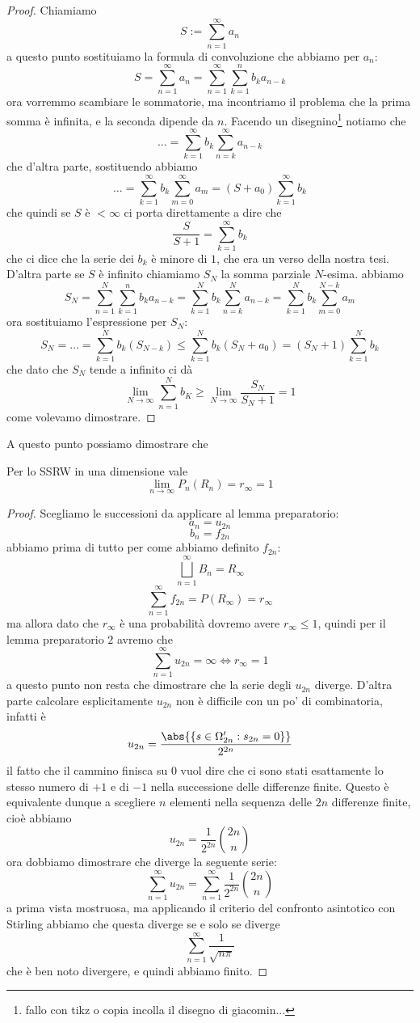 \documentclass[11pt]{scrartcl}
\begin{document}
	\begin{proof}
		Chiamiamo 
		$$S:=\sum_{n=1}^{\infty}a_n$$
		a questo punto sostituiamo la formula di convoluzione che abbiamo per $a_n$:
		$$S=\sum_{n=1}^{\infty}a_n=\sum_{n=1}^{\infty}\sum_{k=1}^{n}b_k a_{n-k}$$
		ora vorremmo scambiare le sommatorie, ma incontriamo il problema che la prima somma è infinita, e la seconda dipende da $n$. Facendo un disegnino\footnote{fallo con tikz o copia incolla il disegno di giacomin...} notiamo che 
		$$\dots=\sum_{k=1}^\infty b_k \sum_{n=k}^{\infty}a_{n-k}$$
		che d'altra parte, sostituendo abbiamo
		$$\dots =\sum_{k=1}^\infty b_k \sum_{m=0}^\infty a_m =(S+a_0)\sum_{k=1}^{\infty}b_k$$
		che quindi se $S$ è $<\infty$ ci porta direttamente a dire che 
		$$\frac{S}{S+1}=\sum_{k=1}^{\infty}b_k$$
		che ci dice che la serie dei $b_k$ è minore di $1$, che era un verso della nostra tesi. D'altra parte se $S$ è infinito chiamiamo $S_N$ la somma parziale $N$-esima. abbiamo
		$$S_N=\sum_{n=1}^{N}\sum_{k=1}^{n}b_k a_{n-k}=\sum_{k=1}^{N}b_k \sum_{n=k}^{N}a_{n-k}=\sum_{k=1}^{N}b_k \sum_{m=0}^{N-k}a_m$$
		ora sostituiamo l'espressione per $S_N$:
		$$S_N=\dots= \sum_{k=1}^{N}b_k (S_{N-k})\le \sum_{k=1}^{N}b_k (S_N+a_0)=(S_N+1)\sum_{k=1}^{N}b_k$$
		che dato che $S_N$ tende a infinito ci dà
		$$\lim_{N\to\infty}\sum_{n=1}^Nb_K\ge \lim_{N\to\infty}\frac{S_N}{S_N+1}=1$$
		come volevamo dimostrare.
	\end{proof}
	A questo punto possiamo dimostrare che
	\begin{theorem}
		Per lo SSRW in una dimensione vale
		$$\lim_{n\to\infty}P_n(R_n) = r_\infty=1$$
	\end{theorem}
	\begin{proof}
		Scegliamo le successioni da applicare al lemma preparatorio: 
		$$a_n=u_{2n}$$
		$$b_n=f_{2n}$$
		abbiamo prima di tutto per come abbiamo definito $f_{2n}$:
		$$\bigsqcup_{n=1}^\infty B_n=R_\infty$$
		$$\sum_{n=1}^{\infty}f_{2n}=P(R_\infty)=r_\infty$$
		ma allora dato che $r_\infty$ è una probabilità dovremo avere $r_\infty\le 1$, quindi per il lemma preparatorio $2$ avremo che
		$$\sum_{n=1}^{\infty}u_{2n}=\infty \iff r_\infty =1$$
		a questo punto non resta che dimostrare che la serie degli $u_{2n}$ diverge. D'altra parte calcolare esplicitamente $u_{2n}$ non è difficile con un po' di combinatoria, infatti è
		$$u_{2n}=\frac{\abs{\left\{s\in \Omega'_{2n}:s_{2n}=0\right\}}}{2^{2n}}$$
		il fatto che il cammino finisca su $0$ vuol dire che ci sono stati esattamente lo stesso numero di $+1$ e di $-1$ nella successione delle differenze finite. Questo è equivalente dunque a scegliere $n$ elementi nella sequenza delle $2n$ differenze finite, cioè abbiamo
		$$u_{2n}=\frac{1}{2^{2n}}\binom{2n}{n}$$
		ora dobbiamo dimostrare che diverge la seguente serie: 
		$$\sum_{n=1}^{\infty}u_{2n}=\sum_{n=1}^{\infty}\frac{1}{2^{2n}}\binom{2n}{n}$$
		a prima vista mostruosa, ma applicando il criterio del confronto asintotico con Stirling abbiamo che questa diverge se e solo se diverge
		$$\sum_{n=1}^{\infty}\frac{1}{\sqrt{n\pi}}$$
		che è ben noto divergere, e quindi abbiamo finito.
	\end{proof}
\end{document}
